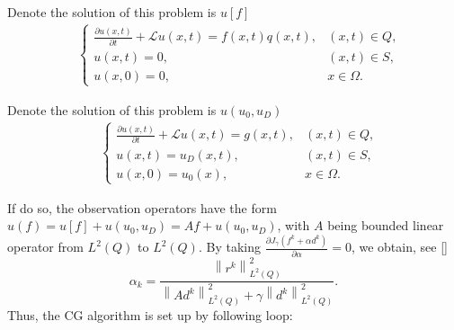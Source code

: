 \documentclass[notitlepage,a4paper,fleqn,9pt]{icmfarticle}
\begin{document}
\begin{multicols}{2}
\begin{bt}\label{bt2.1}
	Denote the solution of this problem is $u[f]$
	\begin{align*}
		\quad\begin{cases}
			\frac{\partial u(x, t)}{\partial t}+\mathcal{L}u(x, t)=f(x, t)q(x, t),&(x, t)\in Q,\\
			u(x, t)=0, & (x, t)\in S,\\
			u(x, 0)=0,&x\in \Omega.
		\end{cases}
	\end{align*}
\end{bt}
\begin{bt}\label{bt2.2}
	Denote the solution of this problem is $u(u_0, u_D)$
	\begin{align*}
		\quad\begin{cases}
			\frac{\partial u(x, t)}{\partial t}+\mathcal{L}u(x, t)=g(x, t),&(x, t)\in Q,\\
			u(x, t)=u_D(x, t), & (x, t)\in S,\\
			u(x, 0)=u_0(x),&x\in \Omega.
		\end{cases}
	\end{align*}
\end{bt}
\noindent If do so, the observation operators have the form $u(f)= u[f]+ u(u_0, u_D)=Af+ u(u_0, u_D)$, with $A$ being bounded linear operator from $L^2(Q)$ to $L^2(Q)$. By taking $\frac{\partial J_\gamma(f^k+\alpha d^k)}{\partial \alpha}=0$, we obtain, see \eqref{}
$$\alpha_k=\frac{\left\|r^k\right\|^2_{L^2(Q)}}{\displaystyle\left\|Ad^k\right\|^2_{L^2(Q)}+\gamma\left\|d^k\right\|^2_{L^2(Q)}}.$$
Thus, the CG algorithm is set up by following loop:


\end{multicols}
\end{document}
